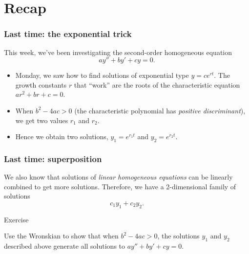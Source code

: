 \def\encoding{UTF-8}

\def\mytitle{Complex Numbers}
\def\subtitle{A brief introduction to complex numbers for solving linear equations}
\def\myauthor{D. Rosoff}
\def\affiliation{The College of Idaho}
\def\mydate{15 March 2013}
\def\latexmode{beamer}
\def\fonttheme{structurebold}
\def\colortheme{crane}
\def\theme{Szeged}

 \usepackage{inparaenum} 

\section{Recap}
\label{recap}

\begin{frame}

\frametitle{Last time: the exponential trick}
\label{lasttime:theexponentialtrick}

This week, we've been investigating the second-order homogeneous equation
\[
   ay'' + by' + cy = 0.
\]

\begin{itemize}
\item Monday, we saw how to find solutions of exponential type $y = ce^{rt}$. The growth constants $r$ that ``work'' are the roots of the characteristic equation $ar^2 + br + c = 0$.

\item When $b^2 - 4ac > 0$ (the characteristic polynomial has \emph{positive discriminant}), we get two values $r_1$ and $r_2$.

\item Hence we obtain two solutions, $y_1 = e^{r_1 t}$ and $y_2 = e^{r_2 t}$.

\end{itemize}

\end{frame}

\begin{frame}

\frametitle{Last time: superposition}
\label{lasttime:superposition}

We also know that solutions of \emph{linear homogeneous equations} can be linearly combined to get more solutions. Therefore, we have a 2-dimensional family of solutions
\[
  c_1 y_1 + c_2 y_2.
\]

 \begin{block}{Exercise} 

Use the Wronskian to show that when $b^2 - 4ac > 0$, the solutions $y_1$ and $y_2$ described above generate all solutions to $ay'' + by' + cy = 0$.
 \end{block} 

\end{frame}

